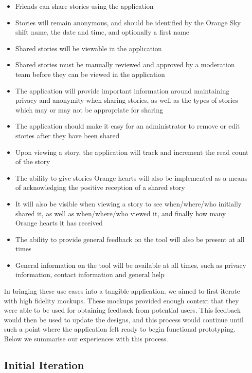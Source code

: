 \begin{itemize}
    \item Friends can share stories using the application
    \item Stories will remain anonymous, and should be identified by the Orange Sky shift name, the date and time, and optionally a first name
    \item Shared stories will be viewable in the application
    \item Shared stories must be manually reviewed and approved by a moderation team before they can be viewed in the application
    \item The application will provide important information around maintaining privacy and anonymity when sharing stories, as well as the types of stories which may or may not be appropriate for sharing
    \item The application should make it easy for an administrator to remove or edit stories after they have been shared
    \item Upon viewing a story, the application will track and increment the read count of the story
    \item The ability to give stories Orange hearts will also be implemented as a means of acknowledging the positive reception of a shared story
    \item It will also be visible when viewing a story to see when/where/who initially shared it, as well as when/where/who viewed it, and finally how many Orange hearts it has received
    \item The ability to provide general feedback on the tool will also be present at all times
    \item General information on the tool will be available at all times, such as privacy information, contact information and general help
\end{itemize}

In bringing these use cases into a tangible application, we aimed to first iterate with high fidelity mockups. These mockups provided enough context that they were able to be used for obtaining feedback from potential users. This feedback would then be used to update the designs, and this process would continue until such a point where the application felt ready to begin functional prototyping. Below we summarise our experiences with this process.

\subsection{Initial Iteration}

